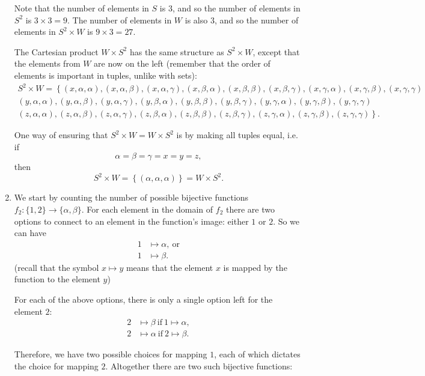 \begin{enumerate}
		Note that the number of elements in $S$ is $3$, and so the number of elements in $S^{2}$ is $3\times3=9$. The number of elements in $W$ is also $3$, and so the number of elements in $S^{2}\times W$ is $9\times3=27$.

		The Cartesian product $W\times S^{2}$ has the same structure as $S^{2}\times W$, except that the elements from $W$ are now on the left (remember that the order of elements is important in tuples, unlike with sets):
		\begin{align*}
			S^{2}\times W =
			\left\{(x,\alpha,\alpha), (x,\alpha,\beta), (x,\alpha,\gamma), (x,\beta,\alpha), (x,\beta,\beta), (x,\beta,\gamma), (x,\gamma,\alpha), (x,\gamma,\beta), (x,\gamma,\gamma)\right.\\
			\left.(y,\alpha,\alpha), (y,\alpha,\beta), (y,\alpha,\gamma), (y,\beta,\alpha), (y,\beta,\beta), (y,\beta,\gamma), (y,\gamma,\alpha), (y,\gamma,\beta), (y,\gamma,\gamma)\right.\\
			\left.(z,\alpha,\alpha), (z,\alpha,\beta), (z,\alpha,\gamma), (z,\beta,\alpha), (z,\beta,\beta), (z,\beta,\gamma), (z,\gamma,\alpha), (z,\gamma,\beta), (z,\gamma,\gamma)\right\}.
		\end{align*}

		One way of ensuring that $S^{2}\times W = W\times S^{2}$ is by making all tuples equal, i.e. if
		\[
			\alpha=\beta=\gamma=x=y=z,
		\]
		then
		\[
			S^{2}\times W = \left\{ (\alpha,\alpha,\alpha) \right\} = W\times S^{2}.
		\]

	\item We start by counting the number of possible bijective functions $f_{2}:\{1,2\}\to\{\alpha,\beta\}$. For each element in the domain of $f_{2}$ there are two options to connect to an element in the function's image: either $1$ or $2$. So we can have
		\begin{align*}
			1&\mapsto\alpha,\ \text{or}\\
			1&\mapsto\beta.
		\end{align*}
		(recall that the symbol $x\mapsto y$ means that the element $x$ is mapped by the function to the element $y$)

		For each of the above options, there is only a single option left for the element $2$:
		\begin{align*}
			2&\mapsto\beta  \ \text{if}\ 1\mapsto\alpha,\\
			2&\mapsto\alpha \ \text{if}\ 2\mapsto\beta.
		\end{align*}

		Therefore, we have two possible choices for mapping $1$, each of which dictates the choice for mapping $2$. Altogether there are two such bijective functions:


\end{enumerate}
